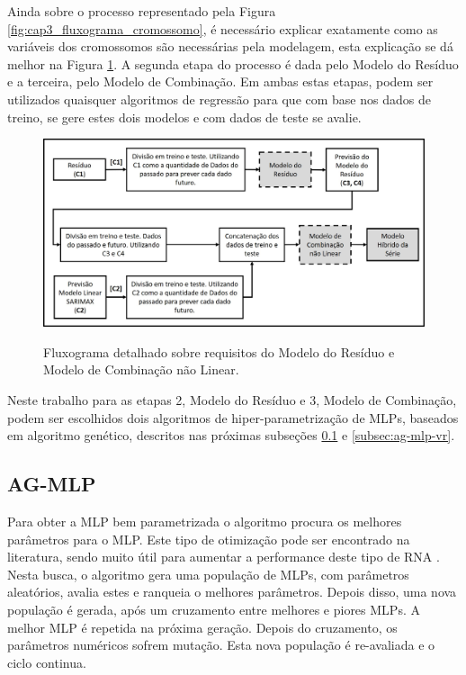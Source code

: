 Ainda sobre o processo representado pela Figura \ref{fig:cap3_fluxograma_cromossomo}, é necessário explicar exatamente como as variáveis dos cromossomos são necessárias pela modelagem, esta explicação se dá melhor na Figura \ref{fig:cap3_fluxograma_modelos_res_comb}. A segunda etapa do processo é dada pelo Modelo do Resíduo e a terceira, pelo Modelo de Combinação. Em ambas estas etapas, podem ser utilizados quaisquer algoritmos de regressão para que com base nos dados de treino, se gere estes dois modelos e com dados de teste se avalie.

\begin{figure}[!htbp]
    \centering
    \caption{Fluxograma detalhado sobre requisitos do Modelo do Resíduo e Modelo de Combinação não Linear.}
    \includegraphics[width=\textwidth]{Figuras/cap3/fluxograma_modelos_res_comb.jpg}
    \label{fig:cap3_fluxograma_modelos_res_comb}
\end{figure}

Neste trabalho para as etapas 2, Modelo do Resíduo e 3, Modelo de Combinação, podem ser escolhidos dois algoritmos de hiper-parametrização de MLPs, baseados em algoritmo genético, descritos nas próximas subseções \ref{subsec:ag-mlp} e \ref{subsec:ag-mlp-vr}.

\subsection{AG-MLP}
\label{subsec:ag-mlp}

Para obter a MLP bem parametrizada o algoritmo procura os melhores parâmetros para o MLP. Este tipo de otimização pode ser encontrado na literatura, sendo muito útil para aumentar a performance deste tipo de RNA \cite{ramchoun2016multilayer, idrissi2016genetic} . Nesta busca, o algoritmo gera uma população de MLPs, com parâmetros aleatórios, avalia estes e ranqueia o melhores parâmetros. Depois disso, uma nova população é gerada, após um cruzamento entre melhores e piores MLPs. A melhor MLP é repetida na próxima geração. Depois do cruzamento, os parâmetros numéricos sofrem mutação. Esta nova população é re-avaliada e o ciclo continua.

